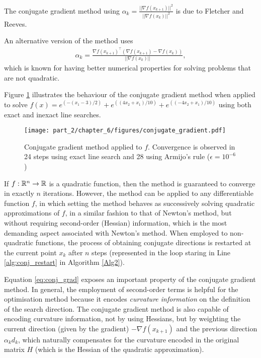 The conjugate gradient method using $\alpha_k = \frac{||\nabla f(x_{k+1})||^2}{||\nabla f(x_k)||^2}$ is due to Fletcher and Reeves. 

	An alternative version of the method uses
	\begin{align*}
		\alpha_k = \frac{\nabla f(x_{k+1})^\top (\nabla f(x_{k+1}) - \nabla f(x_k))}{||\nabla f(x_k)||},
	\end{align*}
	which is known for having better numerical properties for solving  problems that are not quadratic.
	
Figure \ref{fig:conjugate_gradient} illustrates the behaviour of the conjugate gradient method when applied to solve $f(x)=e^{(-(x_1-3)/2)} + e^{((4x_2 + x_1)/10)} + e^{((-4x_2 + x_1)/10)}$ using both exact and inexact line searches. 
%
\begin{figure}
	\texttt{[image: part\_2/chapter\_6/figures/conjugate\_gradient.pdf]}
	\caption{Conjugate gradient method applied to $f$. Convergence is observed in 24 steps using exact line search and 28 using Armijo's rule ($\epsilon = 10^{-6}$)} \label{fig:conjugate_gradient}	
\end{figure}

If $f: \mathbb{R}^n \to \mathbb{R}$ is a quadratic function, then the method is guaranteed to converge in exactly $n$ iterations. However, the method can be applied to any differentiable function $f$, in which setting the method behaves as successively solving quadratic approximations of $f$, in a similar fashion to that of Newton's method, but without requiring second-order (Hessian) information, which is the most demanding aspect associated with Newton's method. When employed to non-quadratic functions, the process of obtaining conjugate directions is restarted at the current point $x_k$ after $n$ steps (represented in the loop staring in Line \ref{alg:conj_restart} in Algorithm \ref{Alg2}).

Equation \eqref{eq:conj_grad} exposes an important property of the conjugate gradient method. In general, the employment of second-order terms is helpful for the optimisation method because it encodes \emph{curvature information} on the definition of the search direction. The conjugate gradient method is also capable of encoding curvature information, not by using Hessians, but by weighting the current direction (given by the gradient) $-\nabla f(x_{k+1})$ and the previous direction $\alpha_kd_k$, which naturally compensates for the curvature encoded in the original matrix $H$ (which is the Hessian of the quadratic approximation).



